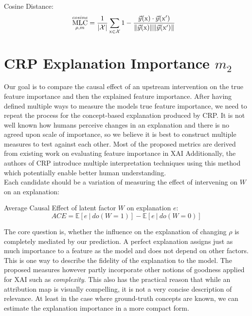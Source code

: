Cosine Distance:
\begin{align}\displaystyle 
& \operatorname*{MLC}_{\rho, m}^{cosine} = \frac{1}{|\mathcal{X}|}\sum_{\mathrm{x} \in \mathcal{X}}  
1 - \frac{\vec{y}(\mathrm{x}) \cdot \vec{y}(\mathrm{x}')}
{\lVert \vec{y}(\mathrm{x}) \rVert \lVert \vec{y}(\mathrm{x}')\rVert }
\end{align}


\section{CRP Explanation Importance $m_2$}\label{section:measure}
Our goal is to compare the causal effect of an upstream intervention on the true feature importance and then the explained feature importance. After having defined multiple ways to measure the models true feature importance, we need to repeat the process for the concept-based explanation produced by CRP. It is not well known how humans perceive changes in an explanation and there is no agreed upon scale of importance, so we believe it is best to construct multiple measures to test against each other. Most of the proposed metrics are derived from existing work on evaluating feature importance in XAI \cite{Sixt2020, Karimi2023, Arras2022} 
 {\color{gray} Additionally, the authors of CRP introduce multiple interpretation techniques using this method which potentially enable better human understanding. }\\

Each candidate should be a variation of measuring the effect of intervening on $W$ on an explanation:
\begin{center}
Average Causal Effect of latent factor $W$ on explanation $e$: \\
\begin{equation}
\displaystyle ACE = \mathbb{E} [e \ | \ do(W=1) ] - \mathbb{E} [ e \ | \ do(W=0) ]
\end{equation}
\end{center}
The core question is, whether the influence on the explanation of changing $\rho$ is completely mediated by our prediction. A perfect explanation assigns just as much importance to a feature as the model and does not depend on other factors. This is one way to describe the fidelity of the explanation to the model. The proposed measures however partly incorporate other notions of goodness applied for XAI such as \textit{complexity}. This also has the practical reason that while an attribution map is visually compelling, it is not a very concise description of relevance. At least in the case where ground-truth concepts are known, we can estimate the explanation importance in a more compact form. \\

